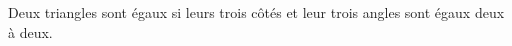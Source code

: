 \documentclass[main.tex]{subfiles}
\begin{document}
\begin{definition}
	Deux triangles sont égaux si leurs trois côtés et leur trois angles sont égaux deux à deux. 
\end{definition} 
%
\end{document}
